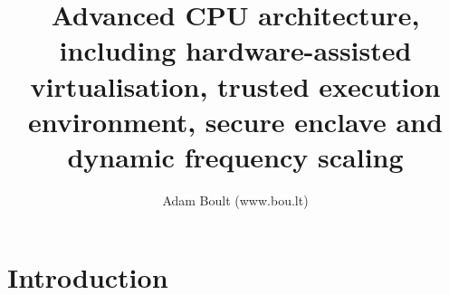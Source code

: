 \documentclass[oneside]{book}
\begin{document}
\author{Adam Boult (www.bou.lt)}
\title{Advanced CPU architecture, including hardware-assisted virtualisation, trusted execution environment, secure enclave and dynamic frequency scaling}
\maketitle

\setcounter{tocdepth}{0}
\tableofcontents



\part{Introduction}
\end{document}
